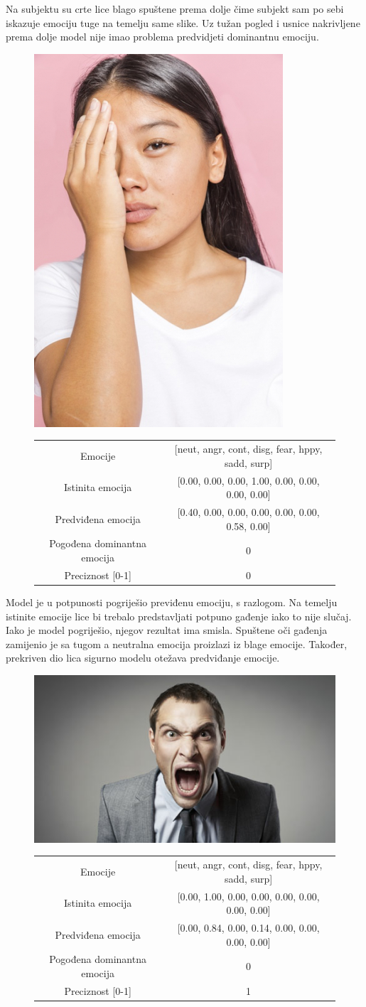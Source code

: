 \documentclass[times, utf8, zavrsni,numeric,pstricks]{fer}
\begin{document}
Na subjektu su crte lice blago spuštene prema dolje čime subjekt sam po sebi iskazuje emociju tuge na temelju same slike. Uz tužan pogled i usnice nakrivljene prema dolje model nije imao problema predvidjeti dominantnu emociju.

\begin{figure}[H]
\centering
		\includegraphics[width=0.3\linewidth, keepaspectratio]{210aae2259c476fa427d9c75.png}
		\begin{tabular}
					{|c|c|}\hline
					Emocije & [neut, angr, cont, disg, fear, hppy, sadd, surp]\\
					Istinita emocija & [0.00, 0.00, 0.00, 1.00, 0.00, 0.00, 0.00, 0.00]\\
					Predviđena emocija	& [0.40, 0.00, 0.00, 0.00, 0.00, 0.00, 0.58, 0.00]\\
					Pogođena dominantna emocija & 0\\
					Preciznost [0-1] & 0\\
					\hline
		\end{tabular}
\end{figure}

Model je u potpunosti pogriješio previđenu emociju, s razlogom. Na temelju istinite emocije lice bi trebalo predstavljati potpuno gađenje iako to nije slučaj. Iako je model pogriješio, njegov rezultat ima smisla. Spuštene oči gađenja zamijenio je sa tugom a neutralna emocija proizlazi iz blage emocije. Također, prekriven dio lica sigurno modelu otežava predviđanje emocije.

\begin{figure}[H]
\centering
		\includegraphics[width=0.3\linewidth, keepaspectratio]{57aangry-main.png}
		\begin{tabular}
					{|c|c|}\hline
					Emocije & [neut, angr, cont, disg, fear, hppy, sadd, surp]\\
					Istinita emocija & [0.00, 1.00, 0.00, 0.00, 0.00, 0.00, 0.00, 0.00]\\
					Predviđena emocija	& [0.00, 0.84, 0.00, 0.14, 0.00, 0.00, 0.00, 0.00]\\
					Pogođena dominantna emocija & 0\\
					Preciznost [0-1] & 1\\
					\hline
		\end{tabular}
\end{figure}
\end{document}
